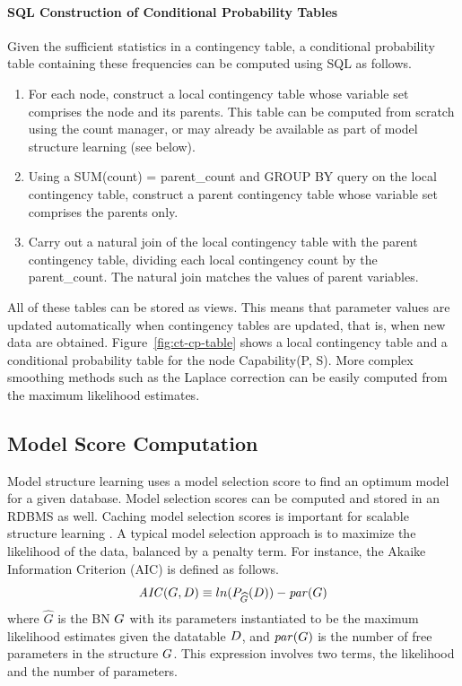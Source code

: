 \documentclass{acm_proc_article-sp}
\begin{document}
\paragraph{SQL Construction of Conditional Probability Tables} Given the sufficient statistics in a contingency table, a conditional probability table containing these frequencies can be computed using SQL as follows.

\begin{enumerate}
\item For each node, construct a local contingency table whose variable set comprises the node and its parents. This table can be computed from scratch using the count manager, or may already be available as part of model structure learning (see below). 
\item Using a SUM(count) = parent\_count and GROUP BY query on the local contingency table, construct a  parent contingency table whose variable set comprises the parents only.
\item Carry out a natural join of the local contingency table with the parent contingency table, dividing each local contingency count by the parent\_count. The natural join matches the values of parent variables. 
\end{enumerate}

All of these tables can be stored as views. This means that parameter values are updated automatically when contingency tables are updated, that is, when new data are obtained. 
Figure~\ref{fig:ct-cp-table} shows a local contingency table and a conditional probability table for the node Capability(P, S). More complex smoothing methods such as the Laplace correction can be easily computed from the maximum likelihood estimates.

\subsection{Model Score Computation}

Model structure learning uses a model selection score to find an optimum model for a given database. Model selection scores can be computed and stored in an RDBMS as well. Caching model selection scores is important for scalable structure learning \cite{tetrad}. A typical model selection approach is to maximize the likelihood of the data, balanced by a penalty term. For instance, the Akaike Information Criterion (AIC) is defined as follows.
\[
\mathit{AIC}(G,D) \equiv ln(P_{\widehat{G}}(D)) - \mathit{par}(G) \]
where $\widehat{G}$ is the BN $G$ with its parameters instantiated to be the maximum likelihood estimates given the datatable $D$, and $\mathit{par}(G)$ is the number of free parameters in the structure $G$. This expression involves two terms, the likelihood and the number of parameters. 
\end{document}
